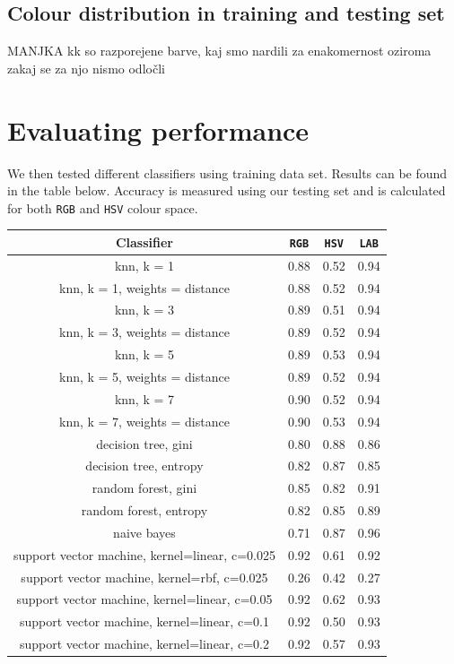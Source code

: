 \documentclass[12pt,a4paper]{article}
\begin{document}
	\subsection{Colour distribution in training and testing set}

	MANJKA kk so razporejene barve, kaj smo nardili za enakomernost oziroma zakaj se za njo nismo odločli

	\section{Evaluating performance}

	We then tested different classifiers using training data set. Results can be found in the table below. Accuracy is measured using our testing set and is calculated for both \texttt{RGB} and \texttt{HSV} colour space.
	
	\begin{center}
		\begin{tabular}{|c|c|c|c|}
			\hline 
			\textbf{Classifier} & \texttt{RGB} & \texttt{HSV} & \texttt{LAB} \\
			\hline
			knn, k = 1 & 0.88 & 0.52 & 0.94 \\ \hline
			knn, k = 1, weights = distance & 0.88 & 0.52 & 0.94 \\ \hline
			knn, k = 3 & 0.89 & 0.51 & 0.94 \\ \hline
			knn, k = 3, weights = distance & 0.89 & 0.52 & 0.94 \\ \hline
			knn, k = 5 & 0.89 & 0.53 & 0.94 \\ \hline
			knn, k = 5, weights = distance & 0.89 & 0.52 & 0.94 \\ \hline
			knn, k = 7 & 0.90 & 0.52 & 0.94 \\ \hline
			knn, k = 7, weights = distance & 0.90 & 0.53 & 0.94 \\ \hline
			decision tree, gini & 0.80 & 0.88 & 0.86 \\ \hline
			decision tree, entropy & 0.82 & 0.87 & 0.85 \\ \hline
			random forest, gini & 0.85 & 0.82 & 0.91 \\ \hline
			random forest, entropy & 0.82 & 0.85 & 0.89 \\ \hline
			naive bayes & 0.71 & 0.87 & 0.96 \\ \hline
			support vector machine, kernel=linear, c=0.025 & 0.92 & 0.61 & 0.92 \\ \hline
			support vector machine, kernel=rbf, c=0.025 & 0.26 & 0.42 & 0.27 \\ \hline
			support vector machine, kernel=linear, c=0.05 & 0.92 & 0.62 & 0.93 \\ \hline
			support vector machine, kernel=linear, c=0.1 & 0.92 & 0.50 & 0.93 \\ \hline
			support vector machine, kernel=linear, c=0.2 & 0.92 & 0.57 & 0.93 \\ \hline
		\end{tabular} \\
	\end{center}
\end{document}
